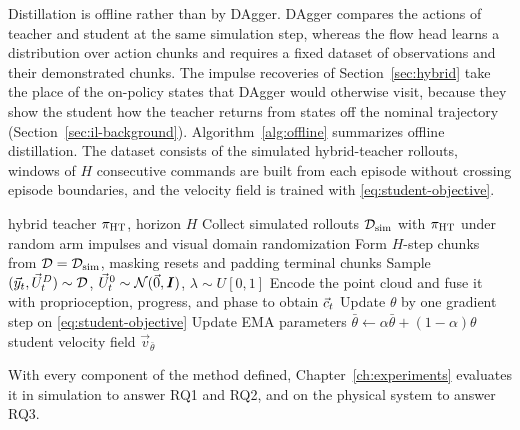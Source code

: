 Distillation is offline rather than by \ac{DAgger}. \ac{DAgger} compares the actions of teacher and student at the same simulation step, whereas the flow head learns a distribution over action chunks and requires a fixed dataset of observations and their demonstrated chunks. The impulse recoveries of Section~\ref{sec:hybrid} take the place of the on-policy states that \ac{DAgger} would otherwise visit, because they show the student how the teacher returns from states off the nominal trajectory (Section~\ref{sec:il-background}). Algorithm~\ref{alg:offline} summarizes offline distillation. The dataset consists of the simulated hybrid-teacher rollouts, windows of $H$ consecutive commands are built from each episode without crossing episode boundaries, and the velocity field is trained with \eqref{eq:student-objective}.

\begin{algorithm}[htb]%
    \caption{Offline flow distillation}\label{alg:offline}
    \begin{algorithmic}[1]
        \Require hybrid teacher $\pi_{\mathrm{HT}}$, horizon $H$
        \State Collect simulated rollouts $\mathcal{D}_{\mathrm{sim}}$ with $\pi_{\mathrm{HT}}$ under random arm impulses and visual domain randomization
        \State Form $H$-step chunks from $\mathcal{D}=\mathcal{D}_{\mathrm{sim}}$, masking resets and padding terminal chunks
        \Repeat
            \State Sample $(\vec{y}_t,\vec{U}^{D}_t)\sim\mathcal{D}$, $\vec{U}^{0}_t\sim\mathcal{N}(\vec{0},\boldsymbol{I})$, $\lambda\sim U[0,1]$
            \State Encode the point cloud and fuse it with proprioception, progress, and phase to obtain $\vec{c}_t$
            \State Update $\theta$ by one gradient step on \eqref{eq:student-objective}
            \State Update \acs{EMA} parameters $\bar{\theta}\leftarrow\alpha\bar{\theta}+(1-\alpha)\theta$
        \State \Return student velocity field $\vec{v}_{\bar{\theta}}$
    \end{algorithmic}
\end{algorithm}%

With every component of the method defined, Chapter~\ref{ch:experiments} evaluates it in simulation to answer RQ1 and RQ2, and on the physical system to answer RQ3.
